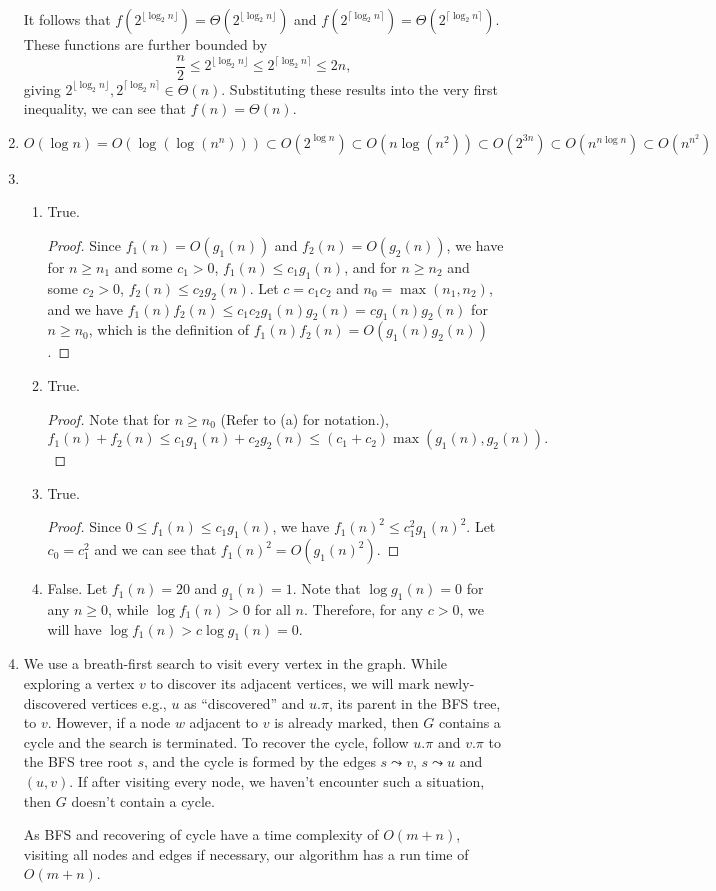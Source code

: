 \documentclass{article}
\begin{document}
\begin{enumerate}
    It follows that $f(2^{\lfloor\log_2 n\rfloor}) = \Theta(2^{\lfloor\log_2 n\rfloor})$ and $f(2^{\lceil\log_2 n\rceil}) = \Theta(2^{\lceil\log_2 n\rceil})$. These functions are further bounded by
    \[
        \frac{n}{2} \le 2^{\lfloor\log_2 n\rfloor} \le 2^{\lceil\log_2 n\rceil} \le 2n,
    \]
    giving $2^{\lfloor\log_2 n\rfloor}, 2^{\lceil\log_2 n\rceil} \in \Theta(n)$. Substituting these results into the very first inequality, we can see that $f(n) = \Theta(n)$.
    \item $O(\log n) = O(\log(\log(n^n))) \subset O(2^{\log n}) \subset O(n\log(n^2)) \subset O(2^{3n}) \subset O(n^{n\log n}) \subset O(n^{n^2})$
    \item
    \begin{enumerate}
        \item True.
        \begin{proof}
            Since $f_1(n) = O(g_1(n))$ and $f_2(n) = O(g_2(n))$, we have for $n \ge n_1$ and some $c_1 > 0$, $f_1(n) \le c_1g_1(n)$, and for $n \ge n_2$ and some $c_2 > 0$, $f_2(n) \le c_2g_2(n)$. Let $c = c_1c_2$ and $n_0 = \max(n_1, n_2)$, and we have $f_1(n)f_2(n) \le c_1c_2g_1(n)g_2(n) = cg_1(n)g_2(n)$ for $n \ge n_0$, which is the definition of $f_1(n)f_2(n) = O(g_1(n)g_2(n))$.
        \end{proof}
        \item True.
        \begin{proof}
            Note that for $n \ge n_0$ (Refer to (a) for notation.),
            \[
                f_1(n) + f_2(n) \le c_1g_1(n) + c_2g_2(n) \le (c_1 + c_2)\max(g_1(n), g_2(n)).
            \]
        \end{proof}
        \item True.
        \begin{proof}
            Since $0 \le f_1(n) \le c_1g_1(n)$, we have $f_1(n)^2 \le c_1^2g_1(n)^2$. Let $c_0 = c_1^2$ and we can see that $f_1(n)^2 = O(g_1(n)^2)$.
        \end{proof}
        \item False. Let $f_1(n) = 20$ and $g_1(n) = 1$. Note that $\log g_1(n) = 0$ for any $n \ge 0$, while $\log f_1(n) > 0$ for all $n$. Therefore, for any $c > 0$, we will have $\log f_1(n) > c\log g_1(n) = 0$.
    \end{enumerate}
    \item We use a breath-first search to visit every vertex in the graph. While exploring a vertex $v$ to discover its adjacent vertices, we will mark newly-discovered vertices e.g., $u$ as ``discovered'' and $u.\pi$, its parent in the BFS tree, to $v$. However, if a node $w$ adjacent to $v$ is already marked, then $G$ contains a cycle and the search is terminated. To recover the cycle, follow $u.\pi$ and $v.\pi$ to the BFS tree root $s$, and the cycle is formed by the edges $s \leadsto v$, $s \leadsto u$ and $(u, v)$. If after visiting every node, we haven't encounter such a situation, then $G$ doesn't contain a cycle.
    
    As BFS and recovering of cycle have a time complexity of $O(m + n)$, visiting all nodes and edges if necessary, our algorithm has a run time of $O(m + n)$.
\end{enumerate}
\end{document}
